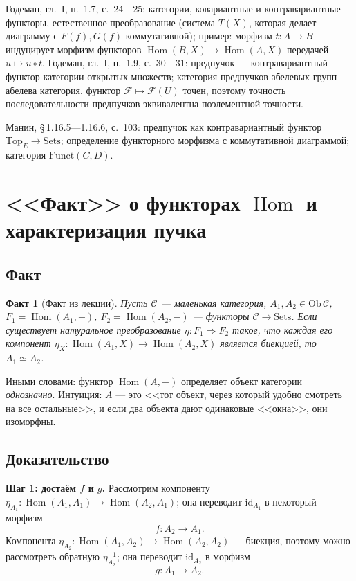 \documentclass[11pt,b5paper]{article}
\newcommand{\Hom}{\operatorname{Hom}}
\newcommand{\id}{\mathrm{id}}
\newcommand{\Shv}[1]{\mathscr{#1}}   %
\theoremstyle{plain}
\newtheorem{factinner}[thminner]{Факт}
\theoremstyle{definition}
\theoremstyle{remark}
\newcommand{\thmbeg}{%
  \par\smallskip
  \begin{lrbox}{\thmbox}%
  \begin{minipage}{\linewidth}}
\newcommand{\thmend}{%
  \end{minipage}%
  \end{lrbox}%
  \noindent\usebox{\thmbox}%
  \par\smallskip}
\newenvironment{fact}{\thmbeg\begin{factinner}}{\end{factinner}\thmend}
\newenvironment{bookbox}{\par\smallskip\begingroup\color{gray}\noindent
  \ignorespaces}{\par\endgroup\smallskip}
\newcommand{\booksrc}[1]{%
  \noindent{\bfseries\small Дополнение из книги:}\par\smallskip
  \noindent#1\par\smallskip}
\let\brutsection\section
\renewcommand{\section}{\Needspace{7\baselineskip}\brutsection}
\let\brutsubsection\subsection
\renewcommand{\subsection}{\Needspace{5\baselineskip}\brutsubsection}
\begin{document}
\begin{bookbox}
\booksrc{Годеман, гл.~I, п.~1.7, с.~24---25: категории, ковариантные и
 контравариантные функторы, естественное преобразование (система
 $T(X)$, которая делает диаграмму с $F(f),G(f)$ коммутативной); пример:
 морфизм $t\colon A\to B$ индуцирует морфизм функторов
 $\Hom(B,X)\to\Hom(A,X)$ передачей $u\mapsto u\circ t$.
 Годеман, гл.~I, п.~1.9, с.~30---31: предпучок --- контравариантный
 функтор категории открытых множеств; категория предпучков абелевых
 групп --- абелева категория, функтор $\Shv{F}\mapsto\Shv{F}(U)$ точен,
 поэтому точность последовательности предпучков эквивалентна
 поэлементной точности.
\par\smallskip
 Манин, \S\,1.16.5---1.16.6, с.~103: предпучок как контравариантный
 функтор $\mathrm{Top}_E\to\mathrm{Sets}$; определение функторного
 морфизма с коммутативной диаграммой; категория
 $\mathrm{Funct}(C,D)$.
}
\end{bookbox}

\section{<<Факт>> о функторах $\Hom$ и характеризация пучка}

\subsection{Факт}
\leavevmode\par
\begin{fact}[Факт из лекции]\label{fact:hom}
Пусть $\mathcal{C}$ --- маленькая категория,
$A_1,A_2\in\mathrm{Ob}\,\mathcal{C}$,
$F_1=\Hom(A_1,-)$, $F_2=\Hom(A_2,-)$ --- функторы
$\mathcal{C}\to\mathrm{Sets}$. Если существует натуральное
преобразование $\eta\colon F_1\Rightarrow F_2$ такое, что каждая его
компонент $\eta_X\colon\Hom(A_1,X)\to\Hom(A_2,X)$ является биекцией, то
$A_1\simeq A_2$.
\end{fact}

Иными словами: функтор $\Hom(A,-)$ определяет объект категории
\emph{однозначно}. Интуиция: $A$ --- это <<тот объект, через который
удобно смотреть на все остальные>>, и если два объекта дают одинаковые
<<окна>>, они изоморфны.

\subsection{Доказательство}
\textbf{Шаг 1: достаём $f$ и $g$.}
Рассмотрим компоненту $\eta_{A_1}\colon\Hom(A_1,A_1)\to\Hom(A_2,A_1)$;
она переводит $\id_{A_1}$ в некоторый морфизм
\[
 f\colon A_2\longrightarrow A_1.
\]
Компонента $\eta_{A_2}\colon\Hom(A_1,A_2)\to\Hom(A_2,A_2)$ --- биекция,
поэтому можно рассмотреть обратную $\eta_{A_2}^{-1}$; она переводит
$\id_{A_2}$ в морфизм
\[
 g\colon A_1\longrightarrow A_2.
\]
\end{document}
